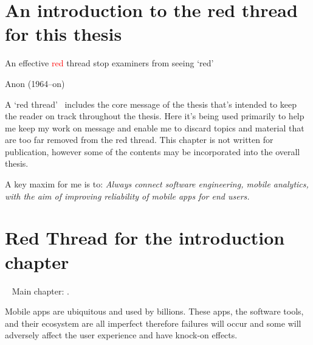 \section[An introduction to the red thread for this thesis]{An introduction to the red thread for this thesis}
\label{section_read_thread} 

\epigraph{{An effective \textcolor{red}{red}} thread stop examiners from seeing `red'}{Anon (1964--on)}

A `red thread'~\footnotemark 
includes the core message of the thesis that's intended to keep the reader on track throughout the thesis. Here it's being used primarily to help me keep my work on message and enable me to discard topics and material that are too far removed from the red thread. This chapter is not written for publication, however some of the contents may be incorporated into the overall thesis.


A key maxim for me is to: \emph{Always connect software engineering, mobile analytics, with the aim of improving reliability of mobile apps for end users.}



\clearpage
\section{Red Thread for the introduction chapter}~\label{red-thread-introduction}
Main chapter: .

Mobile apps are ubiquitous and used by billions. These apps, %
the software tools, and their ecosystem are all imperfect therefore failures will occur and some will adversely affect the user experience and have knock-on effects. %

